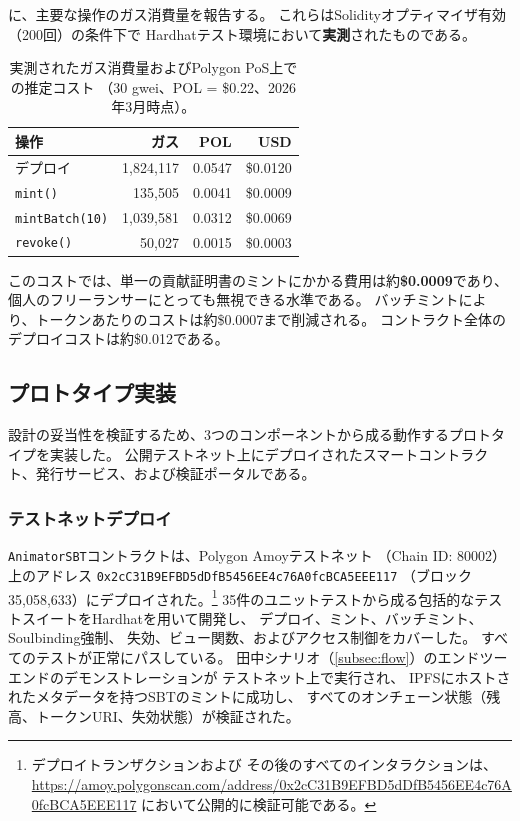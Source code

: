 に、主要な操作のガス消費量を報告する。
これらはSolidityオプティマイザ有効（200回）の条件下で
Hardhatテスト環境において\textbf{実測}されたものである。

\begin{table}[ht]
\centering
\caption{実測されたガス消費量およびPolygon PoS上での推定コスト
（30 gwei、POL = \$0.22、2026年3月時点）。}
\label{tab:gas}
\footnotesize
\setlength{\tabcolsep}{3pt}
\begin{tabular}{@{}lrrr@{}}
\toprule
\textbf{操作} & \textbf{ガス} & \textbf{POL} & \textbf{USD} \\
\midrule
デプロイ          & 1{,}824{,}117  & 0.0547  & \$0.0120  \\
\texttt{mint()}   & 135{,}505      & 0.0041  & \$0.0009  \\
\texttt{mintBatch(10)} & 1{,}039{,}581 & 0.0312 & \$0.0069 \\
\texttt{revoke()} & 50{,}027       & 0.0015  & \$0.0003  \\
\bottomrule
\end{tabular}
\end{table}

このコストでは、単一の貢献証明書のミントにかかる費用は約\textbf{\$0.0009}であり、
個人のフリーランサーにとっても無視できる水準である。
バッチミントにより、トークンあたりのコストは約\$0.0007まで削減される。
コントラクト全体のデプロイコストは約\$0.012である。

\subsection{プロトタイプ実装}
\label{subsec:prototype}

設計の妥当性を検証するため、3つのコンポーネントから成る動作するプロトタイプを実装した。
公開テストネット上にデプロイされたスマートコントラクト、発行サービス、および検証ポータルである。

\subsubsection{テストネットデプロイ}

\texttt{AnimatorSBT}コントラクトは、Polygon Amoyテストネット
（Chain ID: 80002）上のアドレス
\texttt{0x2cC3\allowbreak{}1B9E\allowbreak{}FBD5\allowbreak{}dDfB\allowbreak{}5456\allowbreak{}EE4c\allowbreak{}76A0\allowbreak{}fcBC\allowbreak{}A5EE\allowbreak{}E117}
（ブロック35{,}058{,}633）にデプロイされた。\footnote{デプロイトランザクションおよび
その後のすべてのインタラクションは、
\url{https://amoy.polygonscan.com/address/0x2cC31B9EFBD5dDfB5456EE4c76A0fcBCA5EEE117}
において公開的に検証可能である。}
35件のユニットテストから成る包括的なテストスイートをHardhatを用いて開発し、
デプロイ、ミント、バッチミント、Soulbinding強制、
失効、ビュー関数、およびアクセス制御をカバーした。
すべてのテストが正常にパスしている。
田中シナリオ（\cref{subsec:flow}）のエンドツーエンドのデモンストレーションが
テストネット上で実行され、
IPFSにホストされたメタデータを持つSBTのミントに成功し、
すべてのオンチェーン状態（残高、トークンURI、失効状態）が検証された。

